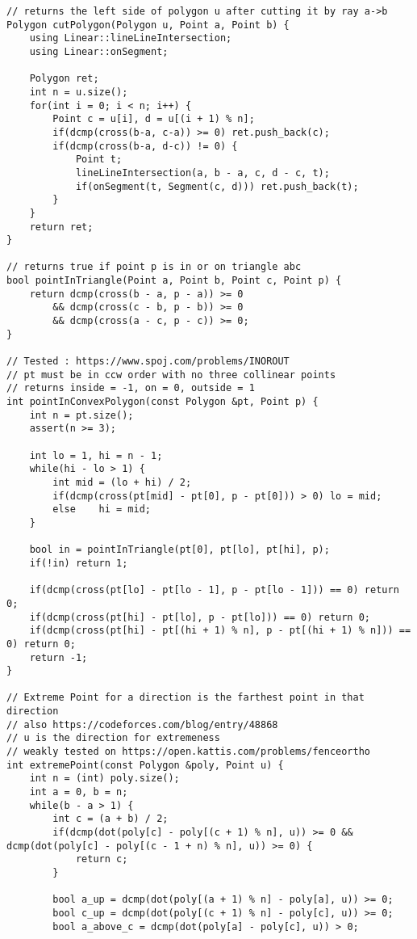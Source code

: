 \documentclass[FSZ,a4paper,onesided]{article}
\begin{document}
\begin{multicols*}{\COLS}
\begin{lstlisting}
// returns the left side of polygon u after cutting it by ray a->b
Polygon cutPolygon(Polygon u, Point a, Point b) {
    using Linear::lineLineIntersection;
    using Linear::onSegment;

    Polygon ret;
    int n = u.size();
    for(int i = 0; i < n; i++) {
        Point c = u[i], d = u[(i + 1) % n];
        if(dcmp(cross(b-a, c-a)) >= 0) ret.push_back(c);
        if(dcmp(cross(b-a, d-c)) != 0) {
            Point t;
            lineLineIntersection(a, b - a, c, d - c, t);
            if(onSegment(t, Segment(c, d))) ret.push_back(t);
        }
    }
    return ret;
}

// returns true if point p is in or on triangle abc
bool pointInTriangle(Point a, Point b, Point c, Point p) {
    return dcmp(cross(b - a, p - a)) >= 0
        && dcmp(cross(c - b, p - b)) >= 0
        && dcmp(cross(a - c, p - c)) >= 0;
}

// Tested : https://www.spoj.com/problems/INOROUT
// pt must be in ccw order with no three collinear points
// returns inside = -1, on = 0, outside = 1
int pointInConvexPolygon(const Polygon &pt, Point p) {
    int n = pt.size();
    assert(n >= 3);

    int lo = 1, hi = n - 1;
    while(hi - lo > 1) {
        int mid = (lo + hi) / 2;
        if(dcmp(cross(pt[mid] - pt[0], p - pt[0])) > 0) lo = mid;
        else    hi = mid;
    }

    bool in = pointInTriangle(pt[0], pt[lo], pt[hi], p);
    if(!in) return 1;

    if(dcmp(cross(pt[lo] - pt[lo - 1], p - pt[lo - 1])) == 0) return 0;
    if(dcmp(cross(pt[hi] - pt[lo], p - pt[lo])) == 0) return 0;
    if(dcmp(cross(pt[hi] - pt[(hi + 1) % n], p - pt[(hi + 1) % n])) == 0) return 0;
    return -1;
}

// Extreme Point for a direction is the farthest point in that direction
// also https://codeforces.com/blog/entry/48868
// u is the direction for extremeness
// weakly tested on https://open.kattis.com/problems/fenceortho
int extremePoint(const Polygon &poly, Point u) {
    int n = (int) poly.size();
    int a = 0, b = n;
    while(b - a > 1) {
        int c = (a + b) / 2;
        if(dcmp(dot(poly[c] - poly[(c + 1) % n], u)) >= 0 && dcmp(dot(poly[c] - poly[(c - 1 + n) % n], u)) >= 0) {
            return c;
        }

        bool a_up = dcmp(dot(poly[(a + 1) % n] - poly[a], u)) >= 0;
        bool c_up = dcmp(dot(poly[(c + 1) % n] - poly[c], u)) >= 0;
        bool a_above_c = dcmp(dot(poly[a] - poly[c], u)) > 0;


\end{lstlisting}
\end{multicols*}
\end{document}
